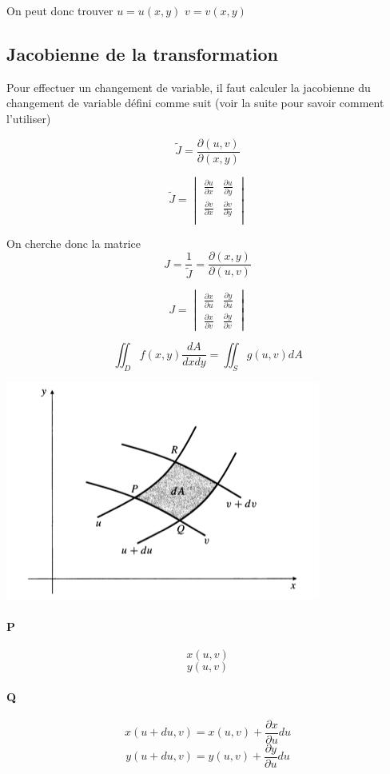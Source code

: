 On peut donc trouver
$u=u(x,y)$
$v=v(x,y)$
\subsection{Jacobienne de la transformation}

Pour effectuer un changement de variable, il faut calculer la jacobienne du changement de variable défini comme suit (voir la suite pour savoir comment l'utiliser)

\[\tilde{J}=\frac{\partial ( u,v)}{\partial ( x,y) }\]

\[\tilde{J} =
\begin{vmatrix}
\frac{\partial u}{\partial x} &\frac{\partial u}{\partial y}\\
\frac{\partial v}{\partial x} &\frac{\partial v}{\partial y}\\
\end{vmatrix}
\]

On cherche donc la matrice $$J=\dfrac{1}{\tilde{J}}=\frac{\partial ( x,y) }{\partial ( u,v)}$$


$$J = \begin{vmatrix}
\frac{\partial x}{\partial u} &\frac{\partial y}{\partial u}\\
\frac{\partial x} {\partial v}&\frac{\partial y}{\partial v}
\end{vmatrix}$$


\[\iint_D f (x,y) \frac{dA}{dxdy}=\iint_S g(u,v) dA\]

\begin{center}
\includegraphics[scale=0.7]{image9.png}
\end{center}

\paragraph{P}
$$x(u,v)$$
$$y(u,v)$$
\paragraph{Q}
\[x(u+du,v)=x(u,v)+\frac{\partial x}{\partial u} du\]
\[y(u+du,v)=y(u,v)+\frac{\partial y}{\partial u} du\]
